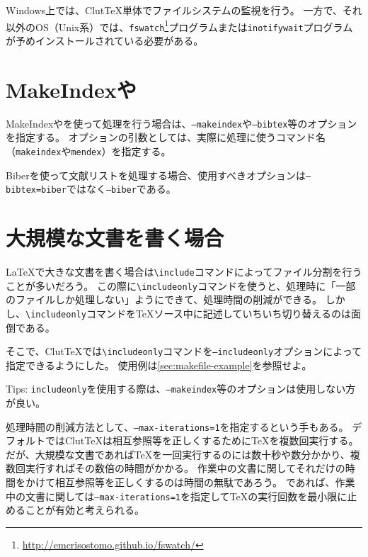 \documentclass[a4paper]{ltjsreport}
\newcommand\ClutTeX{Clut\TeX}
\newcommand\texcmd[1]{\texttt{\textbackslash #1}}
\begin{document}
Windows上では、\ClutTeX{}単体でファイルシステムの監視を行う。
一方で、それ以外のOS（Unix系）では、\texttt{fswatch}\footnote{\url{http://emcrisostomo.github.io/fswatch/}}プログラムまたは\texttt{inotifywait}プログラムが予めインストールされている必要がある。

\section{MakeIndexや\BibTeX}
MakeIndexや\BibTeX を使って処理を行う場合は、\texttt{--makeindex}や\texttt{--bibtex}等のオプションを指定する。
オプションの引数としては、実際に処理に使うコマンド名（\texttt{makeindex}や\texttt{mendex}）を指定する。

Biberを使って文献リストを処理する場合、使用すべきオプションは\texttt{--bibtex=biber}ではなく\texttt{--biber}である。


\section{大規模な文書を書く場合}
\LaTeX{}で大きな文書を書く場合は\texcmd{include}コマンドによってファイル分割を行うことが多いだろう。
この際に\texcmd{includeonly}コマンドを使うと、処理時に「一部のファイルしか処理しない」ようにできて、処理時間の削減ができる。
しかし、\texcmd{includeonly}コマンドを\TeX{}ソース中に記述していちいち切り替えるのは面倒である。

そこで、\ClutTeX{}では\texcmd{includeonly}コマンドを\texttt{--includeonly}オプションによって指定できるようにした。
使用例は\cref{sec:makefile-example}を参照せよ。

Tips: \texttt{includeonly}を使用する際は、\texttt{--makeindex}等のオプションは使用しない方が良い。

処理時間の削減方法として、\texttt{--max-iterations=1}を指定するという手もある。
デフォルトでは\ClutTeX{}は相互参照等を正しくするために\TeX{}を複数回実行する。
だが、大規模な文書であれば\TeX{}を一回実行するのには数十秒や数分かかり、複数回実行すればその数倍の時間がかかる。
作業中の文書に関してそれだけの時間をかけて相互参照等を正しくするのは時間の無駄であろう。
であれば、作業中の文書に関しては\texttt{--max-iterations=1}を指定して\TeX{}の実行回数を最小限に止めることが有効と考えられる。
\end{document}
